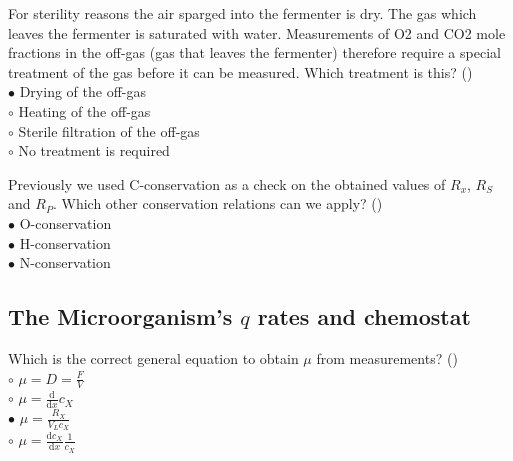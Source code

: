 \documentclass[]{beamer}
\begin{document}
\begin{frame}[shrink] {}
\addtocounter{answers}{1}
\color{blue} For sterility reasons the air sparged into the fermenter is dry. The gas which leaves the fermenter is saturated with water. Measurements of O2 and CO2 mole fractions in the off-gas (gas that leaves the fermenter) therefore require a special treatment of the gas before it can be measured. Which treatment is this?  ()\\
\color{black}
\setlength{\parindent}{-0.4cm}
{\color{red}$\bullet$}     Drying of the off-gas \\
{\color{red}$\circ$} Heating of the off-gas \\
{\color{red}$\circ$} Sterile filtration of the off-gas\\
{\color{red}$\circ$} No treatment is required  
\end{frame}

\begin{frame}[shrink] {}
\addtocounter{answers}{1}
\color{blue}
Previously we used C-conservation as a check on the obtained values of $R_x$, $R_S$ and $R_P$.  Which other conservation relations can we apply?  ()\\
\color{black}
\setlength{\parindent}{-0.4cm}
{\color{red}$\bullet$}     O-conservation \\
{\color{red}$\bullet$} H-conservation\\
{\color{red}$\bullet$} N-conservation  \\
\end{frame}
\subsection{The Microorganism's $q$ rates and chemostat} 
\setcounter{answers}{0}

\begin{frame}[shrink] {}
\addtocounter{answers}{1}
\color{blue}
 Which is the correct general equation to obtain $\mu$ from measurements? ()\\
\color{black}
\setlength{\parindent}{-0.4cm}
{\color{red}$\circ$} $\mu= D = \frac{F}{V}$ \\ 
{\color{red}$\circ$} $\mu = \frac{\mathrm d}{\mathrm d x}c_X$\\
{\color{red}$\bullet$} $\mu = \frac{R_X}{V_{L}c_X}$ \\
{\color{red}$\circ$} $\mu = \frac{\mathrm dc_X}{\mathrm d x} \frac{1}{c_X}$\\
\end{frame}
\end{document}
